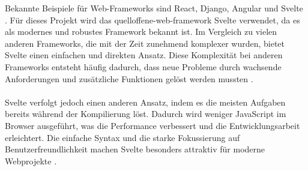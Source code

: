 Bekannte Beispiele für Web-Frameworks sind React, Django, Angular und Svelte \parencite{mdn-intro-to-cs-frameworks}. Für dieses Projekt wird das quelloffene-web-framework Svelte verwendet, da es als modernes und robustes Framework bekannt ist. Im Vergleich zu vielen anderen Frameworks, die mit der Zeit zunehmend komplexer wurden, bietet Svelte einen einfachen und direkten Ansatz. Diese Komplexität bei anderen Frameworks entsteht häufig dadurch, dass neue Probleme durch wachsende Anforderungen und zusätzliche Funktionen gelöst werden mussten \parencite{svelte-rethinking}.\\\\
Svelte verfolgt jedoch einen anderen Ansatz, indem es die meisten Aufgaben bereits während der Kompilierung löst. Dadurch wird weniger JavaScript im Browser ausgeführt, was die Performance verbessert und die Entwicklungsarbeit erleichtert. Die einfache Syntax und die starke Fokussierung auf Benutzerfreundlichkeit machen Svelte besonders attraktiv für moderne Webprojekte \parencite{svelte-rethinking}.

